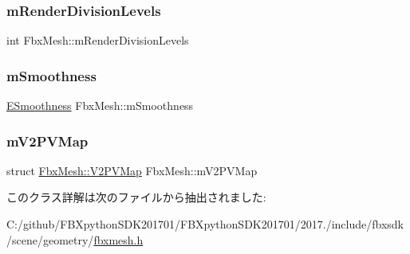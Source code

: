 \mbox{\label{class_fbx_mesh_a1c5f079f731567bbbc1b5af7527e6aa6}} 
\subsubsection{\texorpdfstring{m\+Render\+Division\+Levels}{mRenderDivisionLevels}}
{\footnotesize\ttfamily int Fbx\+Mesh\+::m\+Render\+Division\+Levels\hspace{0.3cm}{\ttfamily [protected]}}

\mbox{\label{class_fbx_mesh_ac4b9e270e53db167213a43bfa49e2d2b}} 
\subsubsection{\texorpdfstring{m\+Smoothness}{mSmoothness}}
{\footnotesize\ttfamily \hyperlink{class_fbx_mesh_a7ac812140810290f718863c170279cf3}{E\+Smoothness} Fbx\+Mesh\+::m\+Smoothness\hspace{0.3cm}{\ttfamily [protected]}}

\mbox{\label{class_fbx_mesh_ad0d46d5f839a3b62fe97684629bfa639}} 
\subsubsection{\texorpdfstring{m\+V2\+P\+V\+Map}{mV2PVMap}}
{\footnotesize\ttfamily struct \hyperlink{struct_fbx_mesh_1_1_v2_p_v_map}{Fbx\+Mesh\+::\+V2\+P\+V\+Map}  Fbx\+Mesh\+::m\+V2\+P\+V\+Map\hspace{0.3cm}{\ttfamily [protected]}}



このクラス詳解は次のファイルから抽出されました\+:\begin{DoxyCompactItemize}
\item 
C\+:/github/\+F\+B\+Xpython\+S\+D\+K201701/\+F\+B\+Xpython\+S\+D\+K201701/2017./include/fbxsdk/scene/geometry/\hyperlink{fbxmesh_8h}{fbxmesh.\+h}\end{DoxyCompactItemize}
